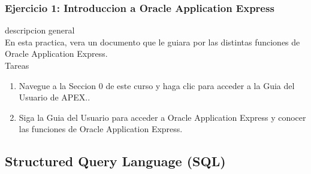 \documentclass[12pt,letterpaper]{article}
\begin{document}
\subsubsection{Ejercicio 1: Introduccion a Oracle Application Express} 
descripcion general  \\
En esta practica, vera un documento que le guiara por las distintas funciones de Oracle Application Express. \\

Tareas\\

\begin{enumerate}[1.]
    \item  Navegue a la Seccion 0 de este curso y haga clic para acceder a la Guia del Usuario de APEX.. 
     
    \item Siga la Guia del Usuario para acceder a Oracle Application Express y conocer las funciones de
Oracle Application Express.

		\end{enumerate}









\newpage
\subsection{Structured Query Language (SQL)}
\end{document}
